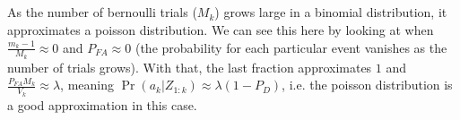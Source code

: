 \documentclass[]{article}
\begin{document}
\subsection{}
As the number of bernoulli trials ($M_k$) grows large in a binomial distribution, it approximates a poisson distribution. We can see this here by looking at when $\frac{m_k - 1}{M_k} \approx 0$ and $P_{FA} \approx 0$ (the probability for each particular event vanishes as the number of trials grows). With that, the last fraction approximates $1$ and $\frac{P_{FA}M_k}{V_k} \approx \lambda$, meaning $\Pr(a_k | Z_{1:k}) \approx \lambda (1 - P_D)$, i.e. the poisson distribution is a good approximation in this case.
\end{document}

